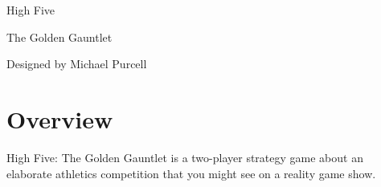 \documentclass[a6paper, 11pt, parskip=half, DIV=15]{scrartcl}
\begin{document}
\begin{titlepage}
\pagecolor{white}
\AddToShipoutPictureBG{
}

\enlargethispage{3\baselineskip}
\setmainfont[Scale=1.5]{Graduate}
\Huge
\begin{center}
High Five

\medskip

\normalsize
The Golden Gauntlet

\vfill


\vfill

\setmainfont[Scale=1.5]{Playball}
\large Designed by Michael Purcell
\end{center}
\end{titlepage}
\pagecolor{white}

\setmainfont{Tex Gyre Schola}
\ClearShipoutPicture
\enlargethispage{1.75\baselineskip}

%

\section*{Overview}
High Five: The Golden Gauntlet is a two-player strategy game about an elaborate athletics competition that you might see on a reality game show.
\end{document}
